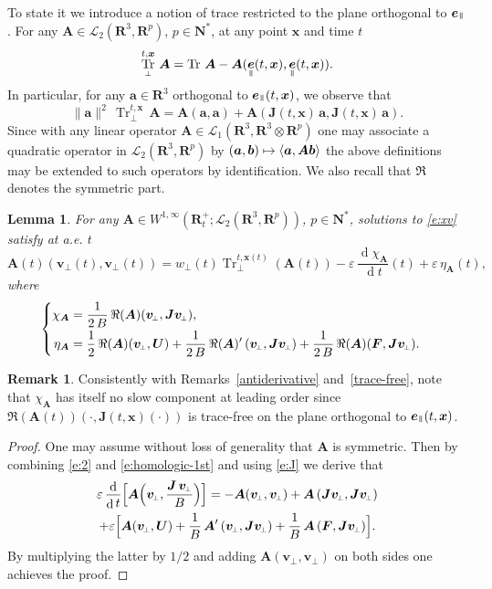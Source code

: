\documentclass[JEP,XML,SOM,Unicode]{cedram}
\let\mathcal\mathscr
\newenvironment{splitcases}
{\begin{cases}\begin{aligned}}
{\end{aligned}\end{cases}}
\newcommand\mto{\mathchoice{\longmapsto}{\mapsto}{\mapsto}{\mapsto}}
\newcommand{\sperp}{{\scriptscriptstyle\perp}}
\let\eps\varepsilon
\DeclareMathOperator\dD{d}\let\dd\dD
\DeclareMathOperator{\Tr}{Tr}
\theoremstyle{plain}
\newtheorem{lemma}[theorem]{Lemma}
\theoremstyle{definition}
\newtheorem{remark}[theorem]{Remark}
\newcommand\br{\begin{remark}}
\newcommand\er{\end{remark}}
\newcommand{\be}{\begin{equation}}
\newcommand{\ee}{\end{equation}}
\newcommand{\bl}{\begin{lemma}}
\newcommand{\el}{\end{lemma}}
\newcommand\R{\mathbf R}
\newcommand{\N}{\mathbf N}
\newcommand\bA{{\boldsymbol A}}
\newcommand\bF{{\boldsymbol F}}
\newcommand\bJ{{\boldsymbol J}}
\newcommand\bU{{\boldsymbol U}}
\newcommand\bfa{{\boldsymbol a}}
\newcommand\bfb{{\boldsymbol b}}
\newcommand\bfv{{\boldsymbol v}}
\newcommand\bfx{{\boldsymbol x}}
\newcommand\cL{{\mathcal L}}
\DeclareMathOperator{\beD}{\boldsymbol{e}}
\newcommand\eDpar{\beD_\mypar}
\newcommand\bvperp{\bfv_{\!\sperp}}
\newcommand\eperp{w_{\!\sperp}}
\newcommand{\Trperp}[1]{\Tr_\sperp^{#1}}
\newcommand{\mypar}{{\mkern3mu\vphantom{\perp}\vrule depth 0pt\mkern2mu\vrule depth 0pt\mkern3mu}}
\begin{document}
To state it we introduce a notion of trace restricted to the plane orthogonal to $\eDpar$. For any $\bA\in\cL_2(\R^3,\R^p)$, $p\in\N^*$, at any point $\bfx$ and time $t$
\be
\label{Trperp}
\Trperp{t,\bfx}\,\bA=\Tr\,\bA-\bA(\eDpar(t,\bfx),\eDpar(t,\bfx)).
\ee
In particular, for any $\bfa\in\R^3$ orthogonal to $\eDpar(t,\bfx)$,
we observe that
\[
\|\bfa\|^2\,\Trperp{t,\bfx}\,\bA
=\bA(\bfa,\bfa)+\bA(\bJ(t,\bfx)\,\bfa,\bJ(t,\bfx)\,\bfa).
\]
Since with any linear operator $\bA\in\cL_1(\R^3,\R^3\otimes\R^p)$ one may
associate a quadratic operator in $\cL_2(\R^3,\R^p)$ by
$(\bfa,\bfb)\mto \langle \bfa,\bA\bfb\rangle$ the above definitions
may be extended to such operators by identification. We also recall that $\Re$ denotes the symmetric part.

\bl
\label{2nd}
For any $\bA\in W^{1,\infty}(\R^+_t; \cL_2(\R^3,\R^p))$, $p\in\N^*$, solutions to \eqref{e:xv} satisfy at a.e. $t$
\[
\bA(t)(\bvperp(t),\bvperp(t))
=\eperp(t)\Trperp{t,\bfx(t)}\left(\bA(t)\right)-\eps\,\frac{\dD\chi_\bA}{\dD t}(t)+\eps\,\eta_\bA(t),
\]
where
\[
\begin{splitcases}
\chi_\bA &=\frac{1}{2\,B}\,\Re(\bA)(\bvperp,\bJ\bvperp),
\\
\eta_\bA&=
\frac12\,\Re(\bA)(\bvperp,\bU)
+\frac{1}{2\,B}\,\Re(\bA)'\left(\bvperp,\bJ\bvperp\right)
+\frac{1}{2\,B}\,\Re(\bA)(\bF,\bJ\bvperp).
\end{splitcases}
\]
\el

\br\label{trace-free-bis}
Consistently with Remarks~\ref{antiderivative} and~\ref{trace-free}, note that $\chi_\bA$ has itself no slow component at leading order since $\Re(\bA(t))\left(\cdot,\bJ(t,\bfx)(\cdot)\right)$ is trace-free on the plane orthogonal to $\eDpar(t,\bfx)$.
\er

\begin{proof}
One may assume without loss of generality that $\bA$ is symmetric. Then by combining \eqref{e:2} and \eqref{e:homologic-1st} and using \eqref{e:J} we derive that
\begin{multline*}
\eps\,\frac{\dD}{\dD t}\Bigl[\bA\Bigl(\bvperp,\frac{\bJ\,\bvperp}{B}\Bigr)\Bigr]
=-\bA(\bvperp,\bvperp)
+\bA\left(\bJ\bvperp,\bJ\bvperp\right)
\\
+\eps\Bigl[\bA(\bvperp,\bU)
+\frac{1}{B}\,\bA'\left(\bvperp,\bJ\bvperp\right)
+\frac{1}{B}\,\bA\left(\bF,\bJ\bvperp\right)\Bigr].
\end{multline*}
By multiplying the latter by $1/2$ and adding $\bA(\bvperp,\bvperp)$ on both sides one achieves the proof.
\end{proof}
\end{document}
